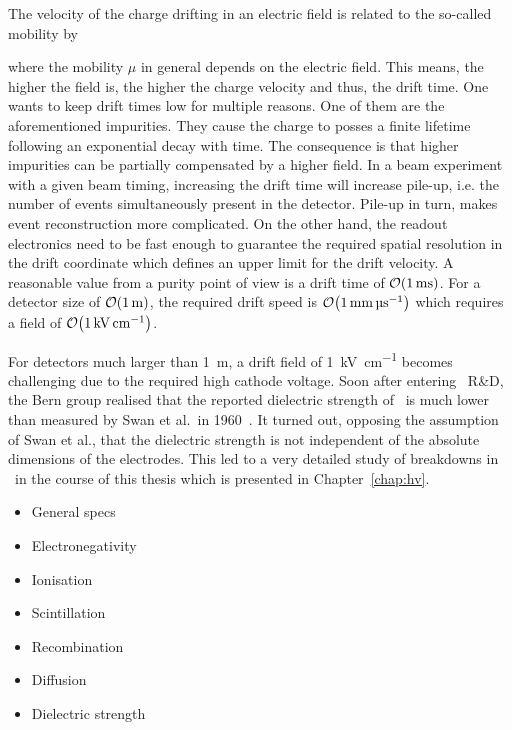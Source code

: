 The velocity of the charge drifting in an electric field is related to the so-called mobility by


where the mobility $\mu$ in general depends on the electric field.
This means, the higher the field is, the higher the charge velocity and thus, the drift time.
One wants to keep drift times low for multiple reasons.
One of them are the aforementioned impurities.
They cause the charge to posses a finite lifetime following an exponential decay with time.
The consequence is that higher impurities can be partially compensated by a higher field.
In a beam experiment with a given beam timing, increasing the drift time will increase pile-up, i.e. the number of events simultaneously present in the detector.
Pile-up in turn, makes event reconstruction more complicated.
On the other hand, the readout electronics need to be fast enough to guarantee the required spatial resolution in the drift coordinate which defines an upper limit for the drift velocity.
A reasonable value from a purity point of view is a drift time of $\order{\SI{1}{\milli\second}}$.
For a detector size of $\order{\SI{1}{\metre}}$, the required drift speed is $\order{\SI{1}{\milli\metre\per\micro\second}}$ which requires a field of $\order{\SI{1}{\kilo\volt\per\centi\metre}}$.

For detectors much larger than \SI{1}{\metre}, a drift field of \SI{1}{\kilo\volt\per\centi\metre} becomes challenging due to the required high cathode voltage.
Soon after entering \lartpc\ R\&D, the Bern group realised that the reported dielectric strength of \lar\ is much lower~\cite{breakdown_14} than measured by Swan et al.\ in 1960~\cite{swan1, swan2}.
It turned out, opposing the assumption of Swan et al., that the dielectric strength is not independent of the absolute dimensions of the electrodes.
This led to a very detailed study of breakdowns in \lar\ in the course of this thesis which is presented in Chapter~\ref{chap:hv}.


\begin{itemize}
	\item General specs
	\item Electronegativity
	\item Ionisation
	\item Scintillation
	\item Recombination
	\item Diffusion
	\item Dielectric strength
\end{itemize}
\cite{NobleGasDetectors}


